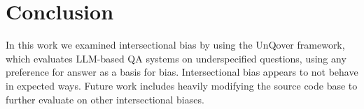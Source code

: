 \documentclass{article}
\begin{document}
\section{Conclusion}

In this work we examined intersectional bias by using the UnQover framework, which evaluates LLM-based QA systems on underspecified questions, using any preference for answer as a basis for bias. Intersectional bias appears to not behave in expected ways. Future work includes heavily modifying the source code base to further evaluate on other intersectional biases. 



\end{document}
